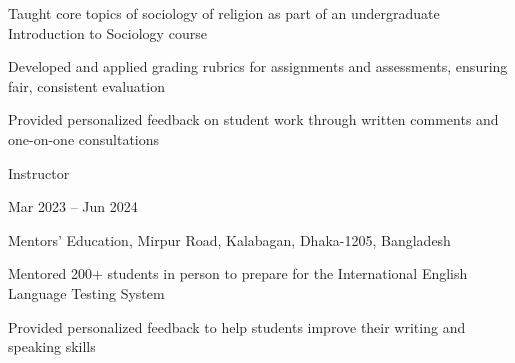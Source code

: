 \documentclass[letterpaper,10pt]{article}
\begin{document}
    \begin{description} [font=$\bullet$]
        \item{Taught core topics of sociology of religion as part of an undergraduate Introduction to Sociology course}
        \item{Developed and applied grading rubrics for assignments and assessments, ensuring fair, consistent evaluation}
        \item{Provided personalized feedback on student work through written comments and one-on-one consultations}
    \end{description}

    \vspace{0.3em}
    \begin{minipage} {.75\linewidth} \begin{flushleft}
            Instructor
        \end{flushleft} \end{minipage}
    \hfill
    \begin{minipage} {.20\linewidth}  \begin{flushright}
            Mar 2023 – Jun 2024
        \end{flushright} \end{minipage}
    Mentors’ Education, Mirpur Road, Kalabagan, Dhaka-1205, Bangladesh\\
    \vspace{0.3em}
    \begin{description} [font=$\bullet$]
        \item{Mentored 200+ students in person to prepare for the International English Language Testing System}
        \item{Provided personalized feedback to help students improve their writing and speaking skills}
    \end{description}
    \vspace{0.3em}
\end{document}
